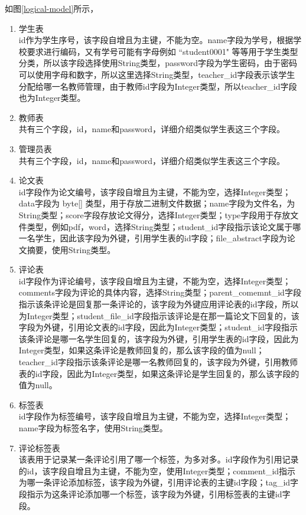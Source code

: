 如图\ref{logical-model}所示，
\begin{enumerate}
    \item 学生表\\
    id作为学生序号，该字段自增且为主键，不能为空。name字段为学号，根据学校要求进行编码，又有学号可能有字母例如 “student0001" 等等用于学生类型分类，所以该字段选择使用String类型，password字段为学生密码，由于密码可以使用字母和数字，所以这里选择String类型，teacher\_id字段表示该学生分配给哪一名教师管理，由于教师id字段为Integer类型，所以teacher\_id字段也为Integer类型。
    \item 教师表\\
    共有三个字段，id，name和password，详细介绍类似学生表这三个字段。
    \item 管理员表\\
    共有三个字段，id，name和password，详细介绍类似学生表这三个字段。
    \item 论文表\\
    id字段作为论文编号，该字段自增且为主键，不能为空，选择Integer类型；data字段为 byte[] 类型，用于存放二进制文件数据；name字段为文件名，为String类型；score字段存放论文得分，选择Integer类型；type字段用于存放文件类型，例如pdf，word，选择String类型；student\_id字段指示该论文属于哪一名学生，因此该字段为外键，引用学生表的id字段；file\_abstract字段为论文摘要，使用String类型。
    \item 评论表\\
    id字段作为评论编号，该字段自增且为主键，不能为空，选择Integer类型；comments字段为评论的具体内容，选择String类型；parent\_comemnt\_id字段指示该条评论是回复那一条评论的，该字段为外键应用评论表的id字段，所以为Integer类型；student\_file\_id字段指示该评论是在那一篇论文下回复的，该字段为外键，引用论文表的id字段，因此为Integer类型；student\_id字段指示该条评论是哪一名学生回复的，该字段为外键，引用学生表的id字段，因此为Integer类型，如果这条评论是教师回复的，那么该字段的值为null；teacher\_id字段指示该条评论是哪一名教师回复的，该字段为外键，引用教师表的id字段，因此为Integer类型，如果这条评论是学生回复的，那么该字段的值为null。
    \item 标签表\\
    id字段作为标签编号，该字段自增且为主键，不能为空，选择Integer类型；name字段为标签名字，使用String类型。
    \item 评论标签表\\
    该表用于记录某一条评论引用了哪一个标签，为多对多。id字段作为引用记录的id，该字段自增且为主键，不能为空，使用Integer类型；comment\_id指示为哪一条评论添加标签，该字段为外键，引用评论表的主键id字段；tag\_id字段指示为这条评论添加哪一个标签，该字段为外键，引用标签表的主键id字段。
\end{enumerate}

